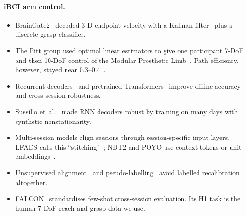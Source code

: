 \paragraph{iBCI arm control.}
\begin{itemize}
\item BrainGate2~\cite{hochberg2012reach} decoded 3-D endpoint velocity with a Kalman
  filter~\cite{wu2006bayesian,kim2008neural} plus a discrete grasp classifier.
\item The Pitt group used optimal linear estimators to give one participant 7-DoF and
  then 10-DoF control of the Modular Prosthetic Limb~\cite{collinger2013high,wodlinger2015ten}.
  Path efficiency, however, stayed near 0.3--0.4~\cite{collinger2013high}.
\item Recurrent decoders~\cite{sussillo2012recurrent,sussillo2016making,deo2024brain}
  and pretrained Transformers~\cite{ye2021representation,ye2023neural,azabou2023unified,ye2025generalist}
  improve offline accuracy and cross-session robustness.
\item Sussillo et~al.~\cite{sussillo2016making} made RNN decoders robust by training on
  many days with synthetic nonstationarity.
\item Multi-session models align sessions through session-specific input layers. LFADS
  calls this ``stitching''~\cite{pandarinath2018inferring}; NDT2 and POYO use context
  tokens or unit embeddings~\cite{ye2023neural,azabou2023unified}.
\item Unsupervised alignment~\cite{degenhart2020stabilization,karpowicz2025stabilizing}
  and pseudo-labelling~\cite{wilson2025longterm,fan2023plug} avoid labelled
  recalibration altogether.
\item FALCON~\cite{karpowicz2024falcon} standardises few-shot cross-session evaluation.
  Its H1 task is the human 7-DoF reach-and-grasp data we use.
\end{itemize}


